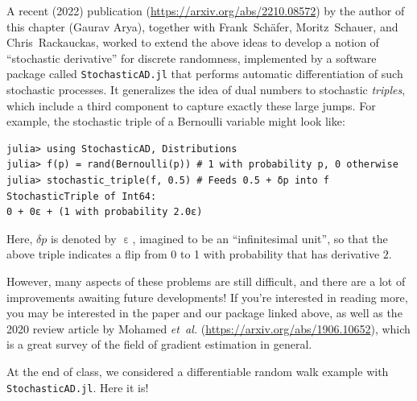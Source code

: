 A recent (2022) publication (\url{https://arxiv.org/abs/2210.08572}) by the author of this chapter (Gaurav Arya), together with Frank~Sch\"afer, Moritz~Schauer, and Chris~Rackauckas, worked to extend the above ideas to develop a notion of 
``stochastic derivative'' for discrete randomness, implemented by a software package called \texttt{StochasticAD.jl} that performs automatic differentiation of such stochastic processes. 
It generalizes the idea of dual numbers to stochastic \emph{triples}, which include a third component to capture exactly these large jumps. For example, the stochastic triple of a Bernoulli variable might look like:
\begin{verbatim}
julia> using StochasticAD, Distributions
julia> f(p) = rand(Bernoulli(p)) # 1 with probability p, 0 otherwise
julia> stochastic_triple(f, 0.5) # Feeds 0.5 + δp into f
StochasticTriple of Int64:
0 + 0ε + (1 with probability 2.0ε)
\end{verbatim}
Here, $\delta p$ is denoted by $\upepsilon$,  imagined to be an ``infinitesimal unit'', so that the above triple indicates a flip from 0 to 1 with probability that has derivative $2$. 

However, many aspects of these problems are still difficult, and there are a lot of improvements awaiting future developments! If you're
interested in reading more, you may be interested in the paper and our package linked above, as well as the 2020 review article by Mohamed \textit{et~al.} (\url{https://arxiv.org/abs/1906.10652}), which is a great survey
of the field of gradient estimation in general.

At the end of class, we considered a differentiable random walk example with \texttt{StochasticAD.jl}. Here it is!



